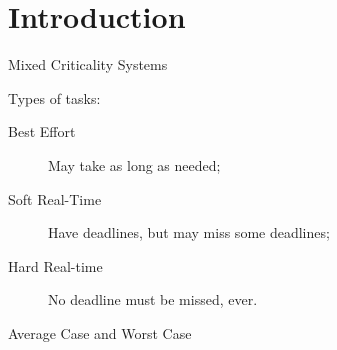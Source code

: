 \section{Introduction}

\begin{frame}{Mixed Criticality Systems}
  
  Types of tasks:
  
  \vspace{4ex}
\begin{description}
\item[Best Effort] May take as long as needed;\\[2ex]
\item[Soft Real-Time] Have deadlines, but may miss some deadlines; \\[2ex]
\item[Hard Real-time] No deadline must be missed, ever. \\[2ex]
\end{description}
\end{frame}

\begin{frame}{Average Case and Worst Case}
\end{frame}

